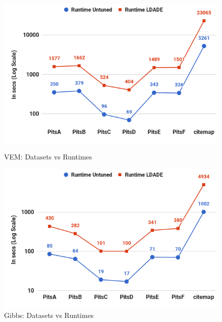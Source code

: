 \documentclass[twocolumn,5p,sort&compress]{elsarticle}
\theoremstyle{break}
\begin{document}
\begin{figure}[!t]
    \centering
  \begin{minipage}{.49\textwidth}
        \captionsetup{labelsep=space,justification=centering}
        \includegraphics[width=\linewidth]{./fig/Run_VEM_sci.png}
  \caption{VEM: Datasets vs Runtimes}
  \label{RQ5 VEM}
  \end{minipage}
  \begin{minipage}{.49\textwidth}
        \captionsetup{justification=centering}
        \includegraphics[width=\linewidth]{./fig/Run_gibbs_sci.png}
  \caption{Gibbs: Datasets vs Runtimes}
  \label{RQ5 Gibbs}
    \end{minipage}%
    \vspace{-0.3cm}
\end{figure}
\end{document}
